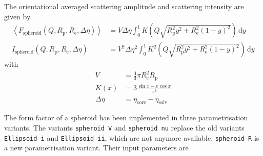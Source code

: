 The orientational averaged scattering amplitude and scattering intensity are given by
\begin{align}
\left\langle F_\text{spheroid}(Q,R_\mathrm{p},R_\mathrm{e},\Delta\eta)\right\rangle &= V\Delta\eta
 \int_0^{1}\! K\left(Q\sqrt{R_\mathrm{p}^2y^2+R_\mathrm{e}^2(1-y)^2}\right) \, \mathrm{d}y \\
I_\text{spheroid}(Q,R_\mathrm{p},R_\mathrm{e},\Delta\eta) &=  V^2\Delta\eta^2
 \int_0^{1}\! K^2\left(Q\sqrt{R_\mathrm{p}^2y^2+R_\mathrm{e}^2(1-y)^2}\right) \, \mathrm{d}y
\end{align}
with
\begin{align}
V &= \frac{4}{3}\pi R_\mathrm{e}^2R_\mathrm{p}\\
K(x) &= 3 \frac{\sin x - x \cos x}{x^3}\\
\Delta \eta &= \eta_\mathrm{core}-\eta_\mathrm{solv}
\end{align}

The form factor of a spheroid has been implemented in three parametrisation variants.
The variants \texttt{spheroid V} and \texttt{spheroid nu} replace the old variants \texttt{Ellipsoid i} and \texttt{Ellipsoid ii}, which are not anymore available. \texttt{spheroid R} is a new parametrisation variant. Their input parameters are


